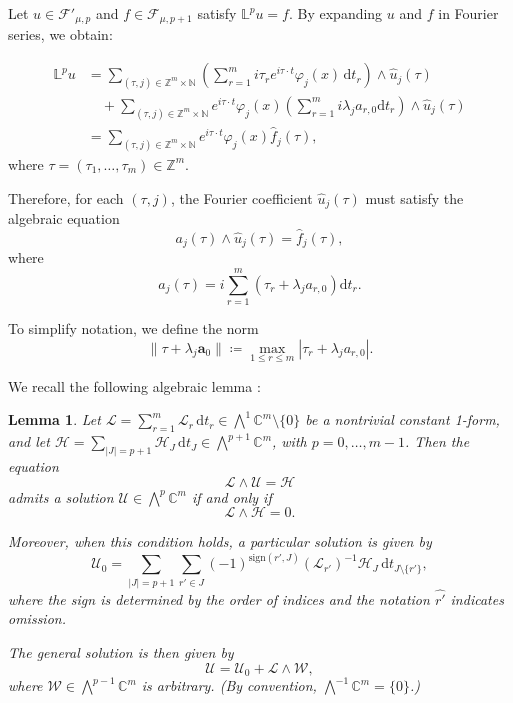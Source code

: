 \documentclass[12pt,reqno]{amsart}
\newtheorem{lemma}[theorem]{Lemma}
\theoremstyle{definition}
\numberwithin{equation}{section}
\begin{document}
Let $u \in \mathscr{F}'_{\mu,p}$ and $f \in \mathscr{F}_{\mu,p+1}$ satisfy  $\mathbb{L}^p u = f$. By expanding $u$ and $f$ in Fourier series, we obtain:

\begin{align*}
	\mathbb{L}^p u &= \sum_{(\tau,j)\in \mathbb{Z}^m \times \mathbb{N}} \left( \sum_{r=1}^m i \tau_r e^{i \tau \cdot t} \varphi_j(x)\, \mathrm{d}t_r \right) \wedge \widehat{u}_{j}(\tau) \\
	&\quad + \sum_{(\tau,j) \in \mathbb{Z}^m \times \mathbb{N}} e^{i \tau \cdot t} \varphi_j(x) \left( \sum_{r=1}^m i \lambda_j a_{r,0} \mathrm{d}t_r \right) \wedge \widehat{u}_j(\tau) \\
	&= \sum_{(\tau,j) \in \mathbb{Z}^m \times \mathbb{N}} e^{i \tau \cdot t} \varphi_j(x) \widehat{f}_j(\tau),
\end{align*}
where $\tau = (\tau_1, \ldots, \tau_m) \in \mathbb{Z}^m$.

Therefore, for each $(\tau,j)$, the Fourier coefficient $\widehat{u}_j(\tau)$ must satisfy the algebraic equation
\begin{equation}\label{a_wedge_u_f}
	a_j(\tau) \wedge \widehat{u}_j(\tau) = \widehat{f}_j(\tau),
\end{equation}
where
\begin{equation}\label{ajtau}
	a_j(\tau) = i \sum_{r=1}^m \left( \tau_r + \lambda_j a_{r,0} \right) \mathrm{d}t_r.
\end{equation}

To simplify notation, we define the norm
\[
\| \tau + \lambda_j \boldsymbol{a}_0 \| \coloneqq \max_{1 \leq r \leq m} |\tau_r + \lambda_j a_{r,0}|.
\]

We recall the following algebraic lemma \cite[Lemma 2.1]{BerPet99jmaa}:

\begin{lemma}\label{sol_ext_alg}
	Let $\mathscr{L} = \sum_{r=1}^m \mathscr{L}_r \, \mathrm{d}t_r \in \textstyle\bigwedge^1 \mathbb{C}^m \setminus \{0\}$ be a nontrivial constant 1-form, and let $\mathscr{H} = \sum_{|J| = p+1} \mathscr{H}_J \, \mathrm{d}t_J \in \textstyle\bigwedge^{p+1} \mathbb{C}^m$, with $p = 0, \ldots, m-1$. Then the equation
	\[
	\mathscr{L} \wedge \mathscr{U} = \mathscr{H}
	\]
	admits a solution $\mathscr{U} \in \textstyle\bigwedge^p \mathbb{C}^m$ if and only if
	\[
	\mathscr{L} \wedge \mathscr{H} = 0.
	\]
	
	Moreover, when this condition holds, a particular solution is given by
	\[
	\mathscr{U}_0 = \sum_{|J|=p+1} \sum_{r' \in J} (-1)^{\mathrm{sign}(r', J)} (\mathscr{L}_{r'})^{-1} \mathscr{H}_J \, \mathrm{d}t_{J \setminus \{r'\}},
	\]
	where the sign is determined by the order of indices and the notation $\widehat{r'}$ indicates omission.
	
	The general solution is then given by
	\[
	\mathscr{U} = \mathscr{U}_0 + \mathscr{L} \wedge \mathscr{W},
	\]
	where $\mathscr{W} \in \textstyle\bigwedge^{p-1} \mathbb{C}^m$ is arbitrary. (By convention, $\textstyle\bigwedge^{-1} \mathbb{C}^m = \{0\}$.)
\end{lemma}
\end{document}
